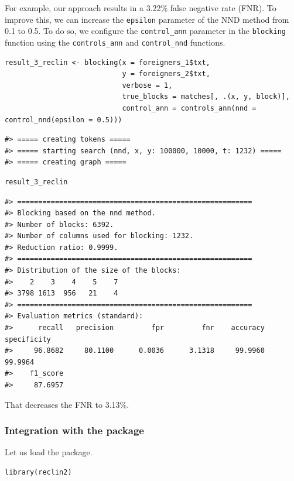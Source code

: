 For example, our approach results in a 3.22\% false negative rate (FNR). To improve this, we can increase the \texttt{epsilon} parameter of the NND method from 0.1 to 0.5. To do so, we configure the \texttt{control\_ann} parameter in the \texttt{blocking} function using the \texttt{controls\_ann} and \texttt{control\_nnd} functions.

\begin{verbatim}
result_3_reclin <- blocking(x = foreigners_1$txt,
                            y = foreigners_2$txt,
                            verbose = 1,
                            true_blocks = matches[, .(x, y, block)],
                            control_ann = controls_ann(nnd = control_nnd(epsilon = 0.5)))
\end{verbatim}

\begin{verbatim}
#> ===== creating tokens =====
#> ===== starting search (nnd, x, y: 100000, 10000, t: 1232) =====
#> ===== creating graph =====
\end{verbatim}

\begin{verbatim}
result_3_reclin
\end{verbatim}

\begin{verbatim}
#> ========================================================
#> Blocking based on the nnd method.
#> Number of blocks: 6392.
#> Number of columns used for blocking: 1232.
#> Reduction ratio: 0.9999.
#> ========================================================
#> Distribution of the size of the blocks:
#>    2    3    4    5    7 
#> 3798 1613  956   21    4 
#> ========================================================
#> Evaluation metrics (standard):
#>      recall   precision         fpr         fnr    accuracy specificity 
#>     96.8682     80.1100      0.0036      3.1318     99.9960     99.9964 
#>    f1_score 
#>     87.6957
\end{verbatim}

That decreases the FNR to 3.13\%.

\subsubsection{\texorpdfstring{Integration with the  package}{Integration with the  package}}\label{integration-with-the-package}

Let us load the  package.

\begin{verbatim}
library(reclin2)
\end{verbatim}

